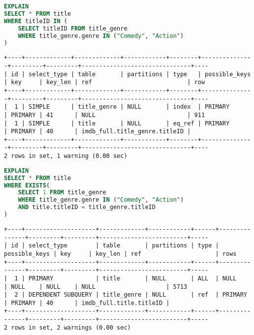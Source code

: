 \documentclass[12pt,a4paper]{article}
\begin{document}
\begin{lstlisting}[language=SQL]
EXPLAIN
SELECT * FROM title
WHERE titleID IN (
    SELECT titleID FROM title_genre 
    WHERE title_genre.genre IN ("Comedy", "Action")
)    
\end{lstlisting}
\begin{lstlisting}[basicstyle = \tiny\ttfamily, columns = fixed]
+----+-------------+-------------+------------+--------+---------------+---------+---------+-------------------------------+----
| id | select_type | table       | partitions | type   | possible_keys | key     | key_len | ref                           | row
+----+-------------+-------------+------------+--------+---------------+---------+---------+-------------------------------+----
|  1 | SIMPLE      | title_genre | NULL       | index  | PRIMARY       | PRIMARY | 41      | NULL                          | 911
|  1 | SIMPLE      | title       | NULL       | eq_ref | PRIMARY       | PRIMARY | 40      | imdb_full.title_genre.titleID |    
+----+-------------+-------------+------------+--------+---------------+---------+---------+-------------------------------+----
2 rows in set, 1 warning (0.00 sec)
\end{lstlisting}

\begin{lstlisting}[language=SQL]
EXPLAIN
SELECT * FROM title
WHERE EXISTS(
    SELECT 1 FROM title_genre 
    WHERE title_genre.genre IN ("Comedy", "Action") 
    AND title.titleID = title_genre.titleID
)
\end{lstlisting}
\begin{lstlisting}[basicstyle = \tiny\ttfamily, columns = fixed]
+----+--------------------+-------------+------------+------+---------------+---------+---------+-------------------------+-----
| id | select_type        | table       | partitions | type | possible_keys | key     | key_len | ref                     | rows
+----+--------------------+-------------+------------+------+---------------+---------+---------+-------------------------+-----
|  1 | PRIMARY            | title       | NULL       | ALL  | NULL          | NULL    | NULL    | NULL                    | 5713
|  2 | DEPENDENT SUBQUERY | title_genre | NULL       | ref  | PRIMARY       | PRIMARY | 40      | imdb_full.title.titleID |     
+----+--------------------+-------------+------------+------+---------------+---------+---------+-------------------------+-----
2 rows in set, 2 warnings (0.00 sec)
\end{lstlisting}
\end{document}
